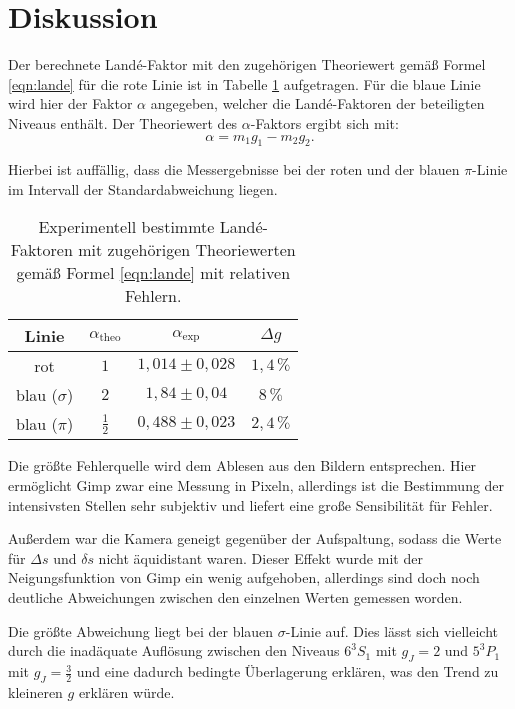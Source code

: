 \section{Diskussion}
\label{sec:Diskussion}
Der berechnete Landé-Faktor mit den zugehörigen Theoriewert gemäß Formel \eqref{eqn:lande} für die rote Linie
ist in Tabelle \ref{tab:result} aufgetragen.
Für die blaue Linie wird hier der Faktor $\alpha$ angegeben, welcher die Landé-Faktoren der beteiligten Niveaus enthält.
Der Theoriewert des $\alpha$-Faktors ergibt sich mit:
\begin{equation}
\alpha=m_1g_1-m_2g_2 \mathrm{.}
\end{equation}

Hierbei ist auffällig, dass die Messergebnisse bei der roten und der blauen $\pi$-Linie
im Intervall der Standardabweichung liegen.
\begin{table}
	\centering
	\caption{Experimentell bestimmte Landé-Faktoren mit zugehörigen Theoriewerten gemäß Formel \eqref{eqn:lande} mit relativen Fehlern.} 
	 \label{tab:result}
	 \begin{tabular}{c | c | c | c}
	 	\toprule
		 Linie & $\alpha_{\text{theo}}$ & $\alpha_{\text{exp}}$ & $\Delta g$ \\
		\midrule
		rot & $1$ & $1,014\pm0,028$ & $1,4\, \si{\percent}$ \\
		blau ($\sigma$) & $2$ & $1,84\pm0,04$ & $8 \, \si{\percent}$ \\
		blau ($\pi$)    & $\frac{1}{2}$ & $0,488\pm0,023$ & $2,4\,\si{\percent}$ \\
		\bottomrule
	\end{tabular}
\end{table}
Die größte Fehlerquelle wird dem Ablesen aus den Bildern entsprechen. Hier ermöglicht
Gimp \cite{gimp} zwar eine Messung in Pixeln, allerdings ist die Bestimmung der intensivsten
Stellen sehr subjektiv und liefert eine große Sensibilität für Fehler.

Außerdem war die Kamera geneigt gegenüber der Aufspaltung, sodass die Werte für $\Delta s$ und
$\delta s$ nicht äquidistant waren. Dieser Effekt wurde mit der Neigungsfunktion von
Gimp \cite{gimp} ein wenig aufgehoben, allerdings sind doch noch deutliche Abweichungen
zwischen den einzelnen Werten gemessen worden.

Die größte Abweichung liegt bei der blauen $\sigma$-Linie auf. Dies lässt sich vielleicht durch
die inadäquate Auflösung zwischen den Niveaus $6^3S_1$ mit $g_J=2$ und $5^3P_1$ mit $g_J=\frac{3}{2}$ und eine dadurch bedingte Überlagerung erklären, was den Trend zu kleineren $g$ erklären würde.
